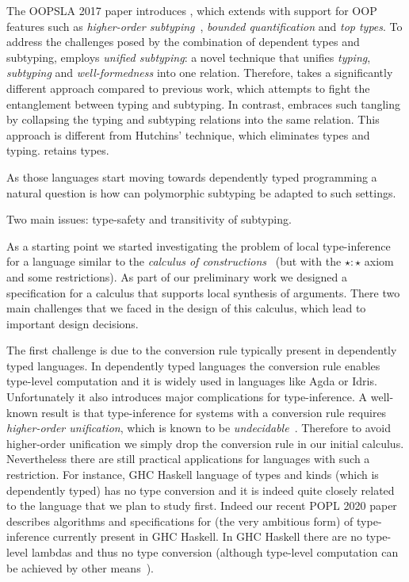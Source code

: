  
The OOPSLA 2017 paper introduces \name, which extends 
\lami with support for OOP features such as
\emph{higher-order subtyping}~\cite{fsubo}, \emph{bounded quantification} and
\emph{top types}. 
To address the challenges posed by
the combination of dependent types and subtyping, \name
employs \emph{unified subtyping}: a novel technique that unifies
\emph{typing}, \emph{subtyping} and \emph{well-formedness} into one
relation. Therefore, \name takes a significantly different
approach compared to previous work, which
attempts to fight the entanglement between typing and subtyping. In
contrast, \name embraces such
tangling by collapsing the typing and subtyping
relations into the same relation.  This approach is different from
Hutchins' technique, which eliminates types and typing. \name
retains types.

As those languages start moving towards dependently typed
programming a natural question is how can polymorphic subtyping be
adapted to such settings.

Two main issues: type-safety and transitivity of subtyping.


As a starting point we started investigating the problem of local
type-inference for a language similar to the \emph{calculus of
  constructions}~\cite{Coquand:Huet} (but with the $\star : \star$ axiom and
some restrictions). As part of our preliminary work we designed a
specification for a calculus that supports local synthesis of arguments.
There two main challenges that we faced in the design of this calculus,
which lead to important design decisions.

The first challenge is due to the conversion rule typically present in
dependently typed languages. %
In dependently typed languages the conversion rule enables type-level
computation and it is widely used in languages like Agda or
Idris. Unfortunately it also introduces major complications for
type-inference. A well-known result is that type-inference for systems
with a conversion rule requires \emph{higher-order
  unification}, which is known to be \emph{undecidable}~\cite{goldfarb1981undecidability}.
Therefore to avoid higher-order unification we simply drop
the conversion rule in our initial calculus.
Nevertheless there are still practical applications for languages
with such a restriction. For instance, GHC Haskell language of types and kinds
(which is dependently typed) has no type conversion and it is indeed quite
closely related to the language that we plan to study first. Indeed
our recent POPL 2020 paper~\cite{xie20kind} describes algorithms and specifications
for (the very ambitious form) of type-inference currently present in GHC Haskell.
In GHC Haskell there are no type-level lambdas and thus no type conversion
(although type-level computation can be achieved by other means~\cite{Chakravarty05associated}).

